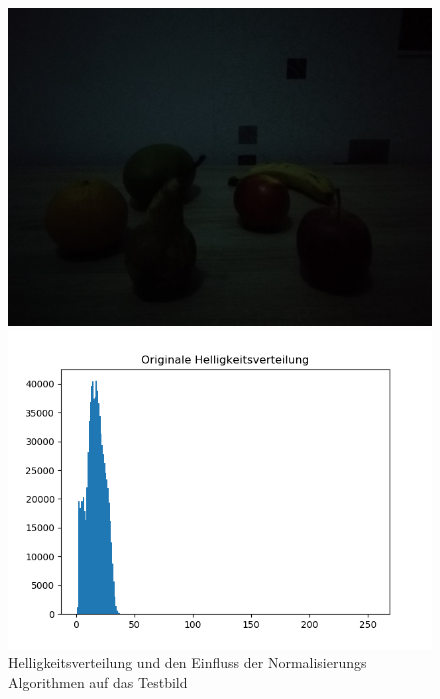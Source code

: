 \documentclass[a4paper,12pt,oneside]{article}
\begin{document}
\begin{figure}[h]
\center
\caption{Helligkeitsverteilung und den Einfluss der Normalisierungs Algorithmen auf das Testbild}
\label{img:hellver}
\begin{minipage}{0.4\textwidth}
\includegraphics[width=.8\textwidth]{Sources/Anhang/resize_0250.jpg}
\end{minipage}
\begin{minipage}{0.4\textwidth}
\includegraphics[width=\textwidth]{Sources/Anhang/resize_0250.png}
\end{minipage}
\end{figure}
\vspace{-1.5cm}
\end{document}
